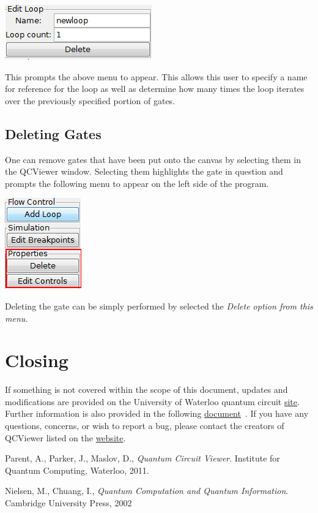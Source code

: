 \documentclass[10pt]{article}
\theoremstyle{definition}
\begin{document}
\begin{center}
\includegraphics{Figures/Misc/LoopCount.png}
\end{center}

This prompts the above menu to appear. This allows this user to specify a name for reference for the loop as well as determine how many times the loop iterates over the previously specified portion of gates. 

\subsection{Deleting Gates}

One can remove gates that have been put onto the canvas by selecting them in the QCViewer window. Selecting them highlights the gate in question and prompts the following menu to appear on the left side of the program.

\begin{center}
\includegraphics{Figures/Misc/DeleteMenu.png}
\end{center}

Deleting the gate can be simply performed by selected the \em Delete \em option from this menu.

\section{Closing}
If something is not covered within the scope of this document, updates and modifications are provided on the University of Waterloo quantum circuit \href{http://qcirc.iqc.uwaterloo.ca/index.php?n=Projects.QCViewer}{site}. Further information is also provided in the following \href{http://qcirc.iqc.uwaterloo.ca/QCViewer/QCViewer.pdf}{document}~\cite{Parent2011Quantum}. If you have any questions, concerns, or wish to report a bug, please contact the creators of QCViewer listed on the \href{http://qcirc.iqc.uwaterloo.ca/index.php?n=Projects.QCViewer}{website}.

\begin{thebibliography}{9}


  Parent, A., Parker, J., Maslov, D.,
  \emph{Quantum Circuit Viewer}.
  Institute for Quantum Computing, Waterloo,
  2011.

  Nielsen, M., Chuang, I.,
  \emph{Quantum Computation and Quantum Information}.
   Cambridge University Press,
   2002

\end{thebibliography}
\end{document}
